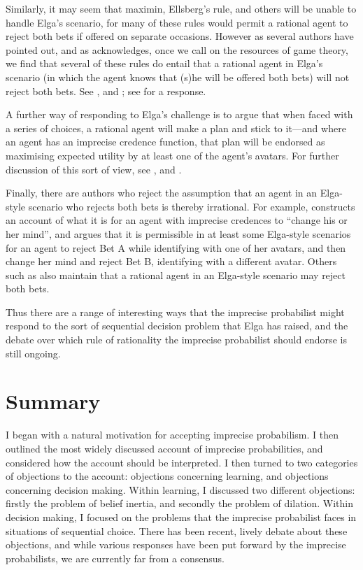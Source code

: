 Similarly, it may seem that maximin, Ellsberg's rule, and others will be unable to handle Elga's scenario, for many of these rules would permit a rational agent to reject both bets if offered on separate occasions. However as several authors have pointed out, and as \citet{elga2012} acknowledges, once we call on the resources of game theory, we find that several of these rules do entail that a rational agent in Elga's scenario (in which the agent knows that (s)he will be offered both bets) will not reject both bets. See \citet{bradleysteele2014a,chandler2014}, and \citet{sahlinweirich2012}; see \citet{mahtaniMS} for a response. 

A further way of responding to Elga's challenge is to argue that when faced with a series of choices, a rational agent will make a plan and stick to it---and where an agent has an imprecise credence function, that plan will be endorsed as maximising expected utility by at least one of the agent's avatars. For further discussion of this sort of view, see \citet{bratman2012,gauthier1986}, and \citet{mcclenen1990}.

Finally, there are authors who reject the assumption that an agent in an Elga-style scenario who rejects both bets is thereby irrational. For example, \citet{moss2014} constructs an account of what it is for an agent with imprecise credences to ``change his or her mind'', and argues that it is permissible in at least some Elga-style scenarios for an agent to reject Bet A while identifying with one of her avatars, and then change her mind and reject Bet B, identifying with a different avatar. Others such as \citet{bradleysteele2014a} also maintain that a rational agent in an Elga-style scenario may reject both bets.
 
Thus there are a range of interesting ways that the imprecise probabilist might respond to the sort of sequential decision problem that Elga has raised, and the debate over which rule of rationality the imprecise probabilist should endorse is still ongoing. 


\section{Summary}

I began with a natural motivation for accepting imprecise probabilism. I then outlined the most widely discussed account of imprecise probabilities, and considered how the account should be interpreted. I then turned to two categories of objections to the account: objections concerning learning, and objections concerning decision making. Within learning, I discussed two different objections: firstly the problem of belief inertia, and secondly the problem of dilation. Within decision making, I focused on the problems that the imprecise probabilist faces in situations of sequential choice. There has been recent, lively debate about these objections, and while various responses have been put forward by the imprecise probabilists, we are currently far from a consensus.